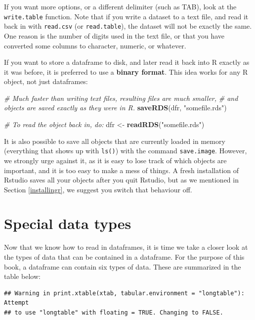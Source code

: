 \documentclass[]{book}
\newenvironment{Shaded}{\begin{snugshade}}{\end{snugshade}}
\newcommand{\CommentTok}[1]{\textcolor[rgb]{0.56,0.35,0.01}{\textit{#1}}}
\newcommand{\KeywordTok}[1]{\textcolor[rgb]{0.13,0.29,0.53}{\textbf{#1}}}
\newcommand{\NormalTok}[1]{#1}
\newcommand{\StringTok}[1]{\textcolor[rgb]{0.31,0.60,0.02}{#1}}
\begin{document}
If you want more options, or a different delimiter (such as TAB), look at the \texttt{write.table} function. Note that if you write a dataset to a text file, and read it back in with \texttt{read.csv} (or \texttt{read.table}), the dataset will not be exactly the same. One reason is the number of digits used in the text file, or that you have converted some columns to character, numeric, or whatever.

If you want to store a dataframe to disk, and later read it back into R exactly as it was before, it is preferred to use a \textbf{binary format}. This idea works for any R object, not just dataframes:

\begin{Shaded}
\begin{Highlighting}[]
\CommentTok{# Much faster than writing text files, resulting files are much smaller,}
\CommentTok{# and objects are saved exactly as they were in R.}
\KeywordTok{saveRDS}\NormalTok{(dfr, }\StringTok{"somefile.rds"}\NormalTok{)}

\CommentTok{# To read the object back in, do:}
\NormalTok{dfr <-}\StringTok{ }\KeywordTok{readRDS}\NormalTok{(}\StringTok{"somefile.rds"}\NormalTok{)}
\end{Highlighting}
\end{Shaded}

It is also possible to save all objects that are currently loaded in memory (everything that shows up with \texttt{ls()}) with the command \texttt{save.image}. However, we strongly urge against it, as it is easy to lose track of which objects are important, and it is too easy to make a mess of things. A fresh installation of Rstudio saves all your objects after you quit Rstudio, but as we mentioned in Section \ref{installingr}, we suggest you switch that behaviour off.

\hypertarget{special-data-types}{%
\section{Special data types}\label{special-data-types}}

Now that we know how to read in dataframes, it is time we take a closer look at the types of data that can be contained in a dataframe. For the purpose of this book, a dataframe can contain six types of data. These are summarized in the table below:

\begin{verbatim}
## Warning in print.xtable(xtab, tabular.environment = "longtable"): Attempt
## to use "longtable" with floating = TRUE. Changing to FALSE.
\end{verbatim}
\end{document}
